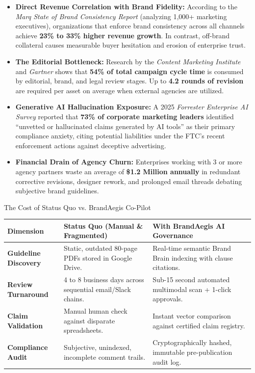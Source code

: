 \documentclass[10pt,a4paper]{article}
\begin{document}
\begin{itemize}[leftmargin=*,itemsep=2.5pt]
  \item \textbf{Direct Revenue Correlation with Brand Fidelity:} According to the \textit{Marq State of Brand Consistency Report} (analyzing 1,000+ marketing executives), organizations that enforce brand consistency across all channels achieve \textbf{23\% to 33\% higher revenue growth}. In contrast, off-brand collateral causes measurable buyer hesitation and erosion of enterprise trust.
  \item \textbf{The Editorial Bottleneck:} Research by the \textit{Content Marketing Institute} and \textit{Gartner} shows that \textbf{54\% of total campaign cycle time} is consumed by editorial, brand, and legal review stages. Up to \textbf{4.2 rounds of revision} are required per asset on average when external agencies are utilized.
  \item \textbf{Generative AI Hallucination Exposure:} A 2025 \textit{Forrester Enterprise AI Survey} reported that \textbf{73\% of corporate marketing leaders} identified ``unvetted or hallucinated claims generated by AI tools'' as their primary compliance anxiety, citing potential liabilities under the FTC's recent enforcement actions against deceptive advertising.
  \item \textbf{Financial Drain of Agency Churn:} Enterprises working with 3 or more agency partners waste an average of \textbf{\$1.2 Million annually} in redundant corrective revisions, designer rework, and prolonged email threads debating subjective brand guidelines.
\end{itemize}

\vspace{0.15cm}

\begin{brandbox}{The Cost of Status Quo vs. BrandAegis Co-Pilot}
  \small
  \begin{tabularx}{\textwidth}{p{3.2cm}X X}
    \textbf{Dimension} & \textbf{Status Quo (Manual \& Fragmented)} & \textbf{With BrandAegis AI Governance} \\
    \midrule
    \textbf{Guideline Discovery} & Static, outdated 80-page PDFs stored in Google Drive. & Real-time semantic Brand Brain indexing with clause citations. \\
    \textbf{Review Turnaround} & 4 to 8 business days across sequential email/Slack chains. & Sub-15 second automated multimodal scan + 1-click approvals. \\
    \textbf{Claim Validation} & Manual human check against disparate spreadsheets. & Instant vector comparison against certified claim registry. \\
    \textbf{Compliance Audit} & Subjective, unindexed, incomplete comment trails. & Cryptographically hashed, immutable pre-publication audit log. \\
  \end{tabularx}
\end{brandbox}
\end{document}
